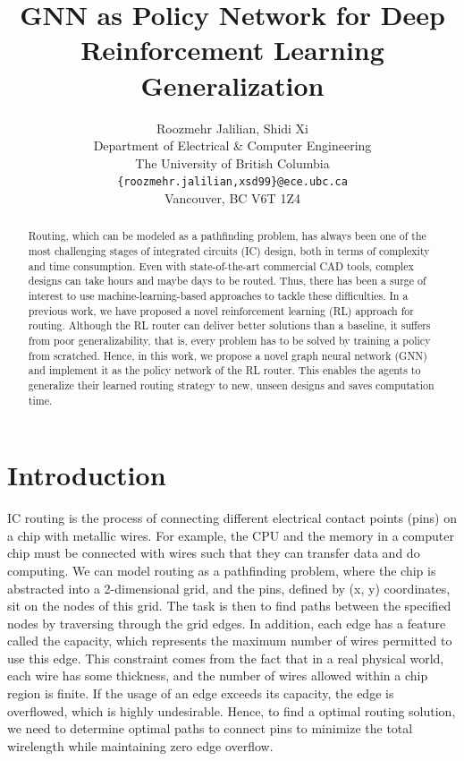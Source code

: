 \documentclass[letterpaper]{article}
\title{GNN as Policy Network for Deep Reinforcement Learning Generalization}
\author{%
    Roozmehr Jalilian, Shidi Xi \\
    Department of Electrical \& Computer Engineering \\
    The University of British Columbia \\
    \texttt{\{roozmehr.jalilian,xsd99\}@ece.ubc.ca} \\
    Vancouver, BC V6T 1Z4
}
\begin{document}
\maketitle


\begin{abstract}
Routing, which can be modeled as a pathfinding problem,  has always been one of the most challenging stages of integrated circuits (IC) design, both in terms of complexity and time consumption. Even with state-of-the-art commercial CAD tools, complex designs can take hours and maybe days to be routed. Thus, there has been a surge of interest to use machine-learning-based approaches to tackle these difficulties. In a previous work, we have proposed a novel reinforcement learning (RL) approach for routing. Although the RL router can deliver better solutions than a baseline, it suffers from poor generalizability, that is, every problem has to be solved by training a policy from scratched. Hence, in this work, we propose a novel graph neural network (GNN) and implement it as the policy network of the RL router. This enables the agents to generalize their learned routing strategy to new, unseen designs and saves computation time.
\end{abstract}

\section{Introduction}
IC routing is the process of connecting different electrical contact points (pins) on a chip with metallic wires. For example, the CPU and the memory in a computer chip must be connected with wires such that they can transfer data and do computing. We can model routing as a pathfinding problem, where the chip is abstracted into a 2-dimensional grid, and the pins, defined by (x, y) coordinates, sit on the nodes of this grid. The task is then to find paths between the specified nodes by traversing through the grid edges. In addition, each edge has a feature called the capacity, which represents the maximum number of wires permitted to use this edge. This constraint comes from the fact that in a real physical world, each wire has some thickness, and the number of wires allowed within a chip region is finite. If the usage of an edge exceeds its capacity, the edge is overflowed, which is highly undesirable. Hence, to find a optimal routing solution, we need to determine optimal paths to connect pins to minimize the total wirelength while maintaining zero edge overflow.
\end{document}
